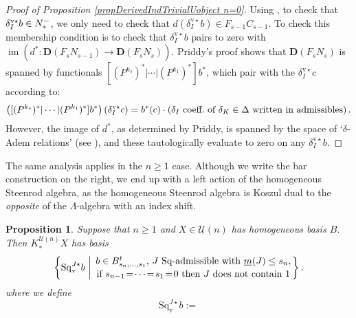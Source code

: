 \documentclass[11pt]{amsart} \renewcommand{\baselinestretch}{1.2}
\theoremstyle{plain}
\newtheorem{prop}[thm]{Proposition}
\numberwithin{equation}{section} %
\theoremstyle{plain}
\newtheorem{prop}[thm]{Proposition}
\numberwithin{equation}{chapter} %
\DeclareMathOperator{\im}{im}
\renewcommand{\to}{\longrightarrow}
\newcommand{\calU}{\mathcal{U}}
\newcommand{\deltaalg}{\Delta} %
\newcommand{\minDimSq}{\underline{m}}
\newcommand{\produces}[3]{#3:#1\sim #2}
\renewcommand{\produces}[3]{#1\rightarrow_{#3} #2}%
\renewcommand{\produces}[3]{#1\overset{\smash{#3}}{\rightarrow} #2}%
\newcommand{\Nop}{N^{\smash{-}}}
\newcommand{\Sq}{\mathrm{Sq}}
\newcommand{\dver}{_\mathrm{v}}
\newcommand{\Sqvstar}[1]{\mathrm{Sq}\dver^{#1\star}}
\newcommand{\deltavstar}{\delta^{\mathrm{v}\star}}
\newcommand{\dual}{\mathbf{D}}
\begin{document}
\begin{Koszul complexes}
\begin{proof}[Proof of Proposition \ref{propDerivedIndTrivialUobject n=0}]
Using \cite[Lemma 3.2]{PriddyKoszul.pdf}, to check that $\deltavstar_Ib\in\Nop_*$, we only need to check that $d(\deltavstar_Ib)\in F_{s-1}C_{s-1}$.
To check this membership condition is to check that $\deltavstar_Ib$ pairs to zero with $\im(d^*:\dual(F_sN_{s-1})\to\dual(F_sN_s))$. Priddy's proof shows that $\dual(F_sN_s)$ is spanned by functionals $[(P^{k_s})^*|\cdots |(P^{k_1})^*]b^*$, which pair with the $\deltavstar_Ic$ according to: %
\[\left([(P^{k_s})^*|\cdots |(P^{k_1})^*]b^*\right)\left(\deltavstar_Ic\right)= b^*(c)\cdot\left(\textup{$\delta_I$ coeff.\ of $\delta_K\in\deltaalg$ written in admissibles}\right).\]
However, the image of $d^*$, as determined by Priddy, is spanned by the space of `$\delta$-Adem relations' (see \cite[Theorem 2.5 and proof]{PriddyKoszul.pdf}), and these tautologically evaluate to zero on any $\deltavstar_Ib$.
\end{proof}
The same analysis applies in the $n\geq1$ case. Although we write the bar construction on the right, we end up with a left action of the homogeneous Steenrod algebra, as the homogeneous Steenrod algebra is Koszul dual to the \emph{opposite} of the $\Lambda$-algebra with an index shift.
\begin{prop}
\label{propDerivedIndTrivialUobject n at least 1}
Suppose that $n\geq1$ and $X\in\calU(n)$ has homogeneous basis $B$. Then $K_*^{\calU(n)}X$ has basis
\[\left\{\Sqvstar{J}b\ \middle|\ \genfrac{}{}{0pt}{}{b\in B_{s_{n},\ldots,s_1}^t\textup{, $J$ $\Sq$-admissible with }\minDimSq(J)\leq s_n,}{\textup{if }s_{n-1}\!=\!\cdots\!=\!s_1\!=\!0\textup{ then $J$ does not contain 1}}\right\}.\]
where we define
\[\Sqvstar{J}b:=
\]
\end{prop}
\end{Koszul complexes}
\end{document}
